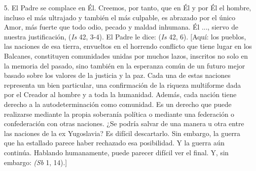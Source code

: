 \begin{body}
	5. El Padre se complace en Él. Creemos, por tanto, que en Él y por Él el hombre, incluso el más ultrajado y también el más culpable, es abrazado por el único Amor, más fuerte que todo odio, pecado y maldad inhumana. Él ..., siervo de nuestra justificación,  (\emph{Is} 42, 3-4). El Padre le dice:  (\emph{Is} 42, 6). {[}Aquí: los pueblos, las naciones de esa tierra, envueltos en el horrendo conflicto que tiene lugar en los Balcanes, constituyen comunidades unidas por muchos lazos, inscritos no solo en la memoria del pasado, sino también en la esperanza común de un futuro mejor basado sobre los valores de la justicia y la paz. Cada una de estas naciones representa un bien particular, una confirmación de la riqueza multiforme dada por el Creador al hombre y a toda la humanidad. Además, cada nación tiene derecho a la autodeterminación como comunidad. Es un derecho que puede realizarse mediante la propia soberanía política o mediante una federación o confederación con otras naciones. ¿Se podría salvar de una manera u otra entre las naciones de la ex Yugoslavia? Es difícil descartarlo. Sin embargo, la guerra que ha estallado parece haber rechazado esa posibilidad. Y la guerra aún continúa. Hablando humanamente, puede parecer difícil ver el final. Y, sin embargo:  \emph{(Sb} 1, 14).{]}
	

\end{body}
